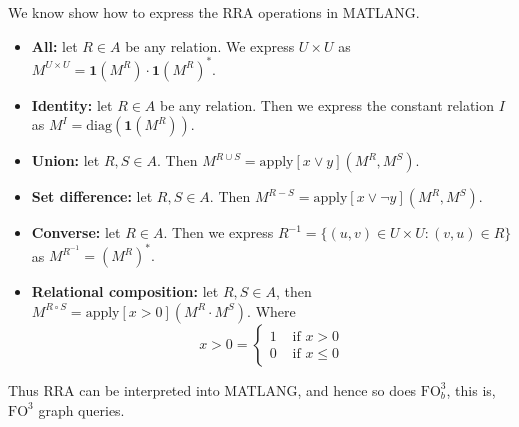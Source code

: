 We know show how to express the RRA operations in MATLANG.

\begin{itemize}
	\item \textbf{All:} let $R\in A$ be any relation. We express $U\times U$ as $M^{U\times U}=\mathbf{1}(M^R)\cdot\mathbf{1}(M^R)^*.$
	\item \textbf{Identity:} let $R\in A$ be any relation. Then we express the constant relation $I$ as $M^I=\text{diag}(\mathbf{1}(M^R)).$
	\item \textbf{Union:} let $R,S\in A$. Then $M^{R\cup S}=\text{apply}[x\vee y](M^R,M^S).$
	\item \textbf{Set difference:} let $R,S\in A$. Then $M^{R-S}=\text{apply}[x\vee\neg y](M^R, M^S).$
	\item \textbf{Converse:} let $R\in A$. Then we express $R^{-1}=\lbrace (u,v)\in U\times U: (v,u)\in R\rbrace$ as $M^{R^{-1}}=(M^R)^*.$
	\item \textbf{Relational composition:} let $R,S\in A$, then $M^{R\circ S}=\text{apply}[x>0](M^R\cdot M^S).$ Where 
	\[ x>0=
    \begin{cases} 
      1 & \text{ if } x>0 \\
      0 & \text{ if } x\leq 0 
    \end{cases}
	\]
\end{itemize}

Thus RRA can be interpreted into MATLANG,  and hence so does $\text{FO}^3_b$, this is, $\text{FO}^3$ graph queries.

